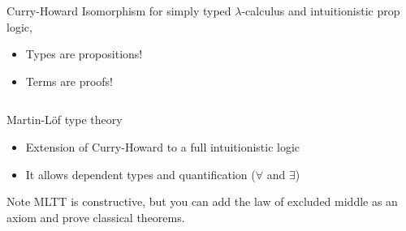 \documentclass{beamer}
\begin{document}
\begin{frame}{Curry-Howard Isomorphism}
  for simply typed $\lambda$-calculus and intuitionistic prop logic,
  \begin{itemize}
    \item Types are propositions!
    \pause
    \item Terms are proofs!
  \end{itemize}

  \pause
  \begin{columns}
    \begin{column}{0.5\textwidth}
      \begin{prooftree}
      \end{prooftree}
    \end{column}
    \pause
    \begin{column}{0.5\textwidth}
      \begin{prooftree}
      \end{prooftree}
    \end{column}
  \end{columns}
 \pause
  \begin{columns}
    \begin{column}{0.5\textwidth}
      \begin{prooftree}
      \end{prooftree}
    \end{column}
    \pause
    \begin{column}{0.5\textwidth}
      \begin{prooftree}
      \end{prooftree}
    \end{column}
  \end{columns}

\end{frame}

\begin{frame}{Martin-L\"{o}f type theory}
  \begin{itemize}
    \item Extension of Curry-Howard to a full intuitionistic logic
    \item It allows dependent types and quantification ($\forall$ and $\exists$)
  \end{itemize}
  \pause
  \begin{alertblock}{Note}
  MLTT is constructive, but you can add
  the law of excluded middle as an axiom and prove classical theorems.
  \end{alertblock}
\end{frame}
\end{document}
